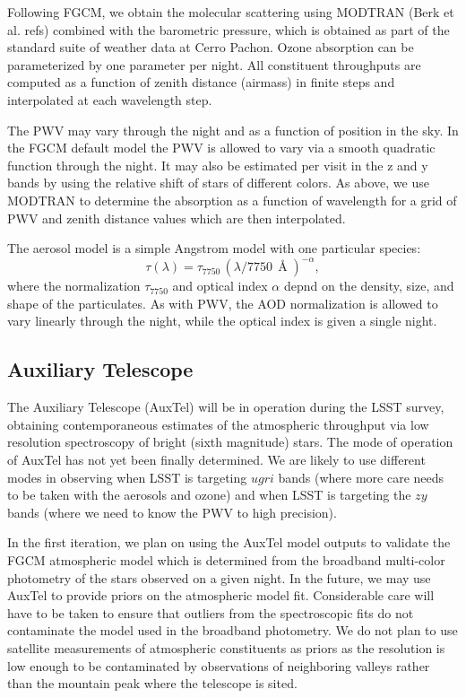 \documentclass[SE,authoryear,lsstdraft,toc]{lsstdoc}
\begin{document}
Following FGCM, we obtain the molecular scattering using MODTRAN (Berk et al. refs) combined
with the barometric pressure, which is obtained as part of the standard suite
of weather data at Cerro Pachon.  Ozone absorption can be parameterized by one
parameter per night.  All constituent throughputs are computed as a function of
zenith distance (airmass) in finite steps and interpolated at each wavelength step.

The PWV may vary through the night and as a function of position in the sky.
In the FGCM default model the PWV is allowed to vary via a smooth quadratic
function through the night.  It may also be estimated per visit in the z and y
bands by using the relative shift of stars of different colors.  As above, we
use MODTRAN to determine the absorption as a function of wavelength for a grid
of PWV and zenith distance values which are then interpolated.

The aerosol model is a simple Angstrom model with one particular species:
%
\begin{equation}
\tau(\lambda) = \tau_{7750}\,(\lambda/7750\,\Angstrom)^{-\alpha},
\end{equation}
%
where the normalization $\tau_{7750}$ and optical index $\alpha$ depnd on the
density, size, and shape of the particulates.  As with PWV, the AOD
normalization is allowed to vary linearly through the night, while the optical
index is given a single night.

\subsection{Auxiliary Telescope}

The Auxiliary Telescope (AuxTel) will be in operation during the LSST survey,
obtaining contemporaneous estimates of the atmospheric throughput via low
resolution spectroscopy of bright (sixth magnitude) stars.  The mode of
operation of AuxTel has not yet been finally determined.  We are likely to use
different modes in observing when LSST is targeting $ugri$ bands (where more
care needs to be taken with the aerosols and ozone) and when LSST is targeting
the $zy$ bands (where we need to know the PWV to high precision).

In the first iteration, we plan on using the AuxTel model outputs to validate
the FGCM atmospheric model which is determined from the broadband multi-color
photometry of the stars observed on a given night.  In the future, we may use
AuxTel to provide priors on the atmospheric model fit.  Considerable care will
have to be taken to ensure that outliers from the spectroscopic fits do not
contaminate the model used in the broadband photometry.  We do not plan to use
satellite measurements of atmospheric constituents as priors as the resolution
is low enough to be contaminated by observations of neighboring valleys rather
than the mountain peak where the telescope is sited.
\end{document}
